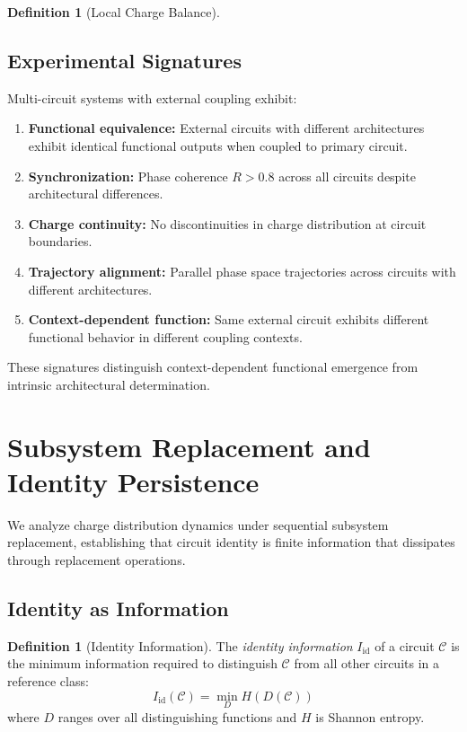 \documentclass[12pt,a4paper]{article}
\theoremstyle{plain}
\theoremstyle{definition}
\newtheorem{definition}[theorem]{Definition}
\theoremstyle{remark}
\begin{document}
\begin{definition}[Local Charge Balance]
\subsection{Experimental Signatures}

Multi-circuit systems with external coupling exhibit:

\begin{enumerate}
\item \textbf{Functional equivalence:} External circuits with different architectures exhibit identical functional outputs when coupled to primary circuit.

\item \textbf{Synchronization:} Phase coherence $R > 0.8$ across all circuits despite architectural differences.

\item \textbf{Charge continuity:} No discontinuities in charge distribution at circuit boundaries.

\item \textbf{Trajectory alignment:} Parallel phase space trajectories across circuits with different architectures.

\item \textbf{Context-dependent function:} Same external circuit exhibits different functional behavior in different coupling contexts.
\end{enumerate}

These signatures distinguish context-dependent functional emergence from intrinsic architectural determination.
\section{Subsystem Replacement and Identity Persistence}
\label{sec:subsystem_replacement}

We analyze charge distribution dynamics under sequential subsystem replacement, establishing that circuit identity is finite information that dissipates through replacement operations.

\subsection{Identity as Information}

\begin{definition}[Identity Information]
\label{def:identity_info}
The \emph{identity information} $I_{\text{id}}$ of a circuit $\mathcal{C}$ is the minimum information required to distinguish $\mathcal{C}$ from all other circuits in a reference class:
\begin{equation}
I_{\text{id}}(\mathcal{C}) = \min_{D} H(D(\mathcal{C}))
\end{equation}
where $D$ ranges over all distinguishing functions and $H$ is Shannon entropy.
\end{definition}


\end{definition}
\end{document}
